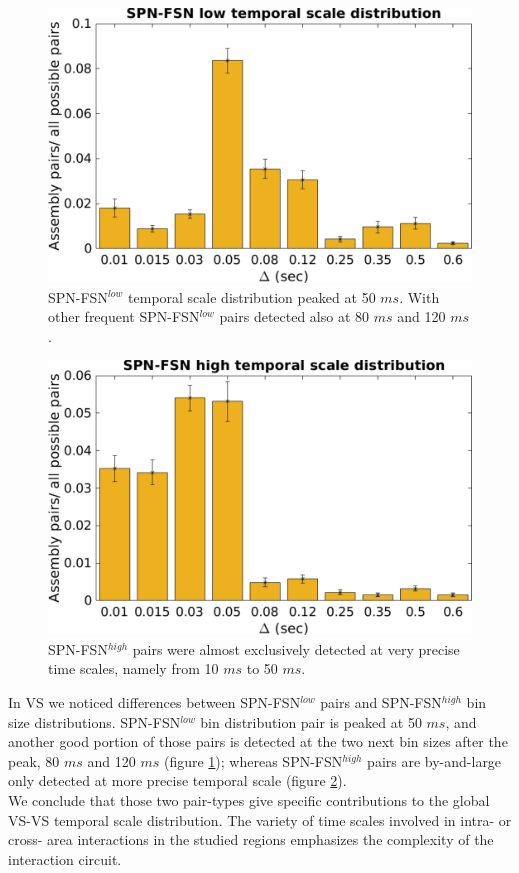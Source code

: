 \begin{figure}
    \centering
    \includegraphics[scale=0.5]{figures/SPN_FSNlow1.pdf}
    \caption{SPN-FSN$^{low}$ temporal scale distribution peaked at 50 $ms$. With other frequent SPN-FSN$^{low}$ pairs detected also at 80 $ms$ and 120 $ms$.}
    \label{fig:SPN_FSNlowBin}
\end{figure}
\begin{figure}
    \centering
    \includegraphics[scale=0.5]{figures/SPN_FSNhigh1.pdf}
    \caption{SPN-FSN$^{high}$ pairs were almost exclusively detected at very precise time scales, namely from 10 $ms$ to 50 $ms$.}
    \label{fig:SPN_FSNhighBin}
\end{figure}
In VS we noticed differences between SPN-FSN$^{low}$ pairs and SPN-FSN$^{high}$ bin size distributions. SPN-FSN$^{low}$ bin distribution pair is peaked at 50 $ms$, and another good portion of those pairs is detected at the two next bin sizes after the peak, 80 $ms$ and 120 $ms$ (figure \ref{fig:SPN_FSNlowBin}); whereas SPN-FSN$^{high}$ pairs are by-and-large only detected at more precise temporal scale (figure \ref{fig:SPN_FSNhighBin}).\\We conclude that those two pair-types give specific contributions to the global VS-VS temporal scale distribution. The variety of time scales involved in intra- or cross- area interactions in the studied regions emphasizes the complexity of the interaction circuit.
